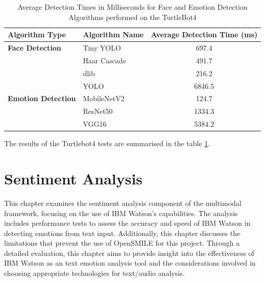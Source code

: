 \begin{table}[h!]
\centering{}
\caption{Average Detection Times in Milliseconds for Face and Emotion Detection Algorithms performed on the TurtleBot4}
\begin{tabular}{|l|l|c|}
\hline
\textbf{Algorithm Type} & \textbf{Algorithm Name} & \textbf{Average Detection Time (ms)} \\ \hline
\textbf{Face Detection} & Tiny YOLO               & 697.4                                \\ \cline{2-3}
                        & Haar Cascade            & 491.7                                \\ \cline{2-3}
                        & dlib                    & 216.2                                \\ \cline{2-3}
                        & YOLO                    & 6846.5                               \\ \hline
\textbf{Emotion Detection} & MobileNetV2          & 124.7                                \\ \cline{2-3}
                        & ResNet50                & 1334.3                               \\ \cline{2-3}
                        & VGG16                   & 5384.2                               \\ \hline
\end{tabular}
\label{tab:algorithm_detection_times_ms_robot}
\end{table}

The results of the Turtlebot4 tests are summarised in the table \ref{tab:algorithm_detection_times_ms_robot}.

\section{Sentiment Analysis}

This chapter examines the sentiment analysis component of the multimodal framework, focusing on the use of IBM Watson's capabilities. The analysis includes performance tests to assess the accuracy and speed of IBM Watson in detecting emotions from text input. Additionally, this chapter discusses the limitations that prevent the use of OpenSMILE for this project. Through a detailed evaluation, this chapter aims to provide insight into the effectiveness of IBM Watson as an text emotion analysis tool and the considerations involved in choosing appropriate technologies for text/audio analysis.

